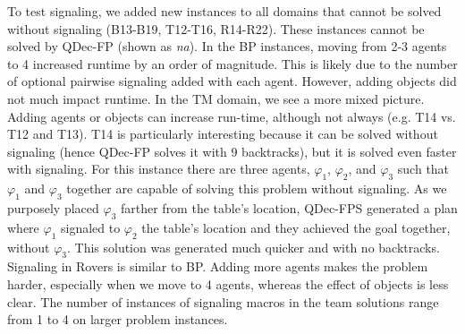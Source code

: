 \documentclass[letterpaper]{article} %
\theoremstyle{definition}
\begin{document}
To test signaling, we added new instances to all domains that cannot be solved without signaling (B13-B19, T12-T16, R14-R22). These instances cannot be solved
by QDec-FP (shown as \emph{na}).
In the BP instances, moving from 2-3 agents to 4 increased runtime by an order of magnitude. This is likely due to the number of optional pairwise signaling added with each agent. However, adding objects did not much impact runtime. 
In the TM domain, we see a more mixed picture. Adding agents or objects can increase run-time, although not always (e.g. T14 vs. T12 and T13).
T14 is particularly interesting because it can be solved without signaling (hence QDec-FP solves it with 9 backtracks), but it is solved even faster with signaling.
For this instance there are three agents, $\varphi_1$, $\varphi_2$, and $\varphi_3$ such that $\varphi_1$ and $\varphi_3$ together are capable of solving this problem without signaling. 
As we purposely placed $\varphi_3$ farther from the table's location, QDec-FPS generated a plan where $\varphi_1$ signaled to $\varphi_2$ the table's location and they achieved the goal together, without $\varphi_3$. This solution was generated much quicker and with no backtracks. 
Signaling in Rovers is similar to BP.
Adding more agents makes the problem harder,
especially when we move to 4 agents, whereas the effect of objects is less clear.
The number of instances of signaling macros in the team solutions range from 1 to 4 on larger problem instances.
\end{document}
